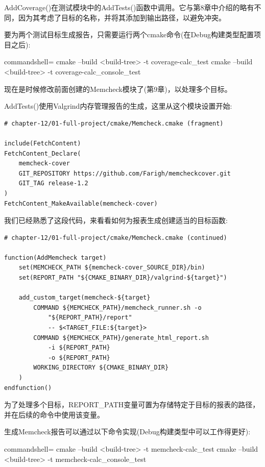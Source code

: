 AddCoverage()在测试模块中的AddTests()函数中调用。它与第8章中介绍的略有不同，因为其考虑了目标的名称，并将其添加到输出路径，以避免冲突。

要为两个测试目标生成报告，只需要运行两个cmake命令(在Debug构建类型配置项目之后):

\begin{tcblisting}{commandshell={}}
cmake --build <build-tree> -t coverage-calc_test
cmake --build <build-tree> -t coverage-calc_console_test
\end{tcblisting}

现在是时候修改前面创建的Memcheck模块了(第9章)，以处理多个目标。


AddTests()使用Valgrind内存管理报告的生成，这里从这个模块设置开始:

\begin{lstlisting}[style=styleCMake]
# chapter-12/01-full-project/cmake/Memcheck.cmake (fragment)

include(FetchContent)
FetchContent_Declare(
	memcheck-cover
	GIT_REPOSITORY https://github.com/Farigh/memcheckcover.git
	GIT_TAG release-1.2
)
FetchContent_MakeAvailable(memcheck-cover)
\end{lstlisting}

我们已经熟悉了这段代码，来看看如何为报表生成创建适当的目标函数:

\begin{lstlisting}[style=styleCMake]
# chapter-12/01-full-project/cmake/Memcheck.cmake (continued)

function(AddMemcheck target)
	set(MEMCHECK_PATH ${memcheck-cover_SOURCE_DIR}/bin)
	set(REPORT_PATH "${CMAKE_BINARY_DIR}/valgrind-${target}")
	
	add_custom_target(memcheck-${target}
		COMMAND ${MEMCHECK_PATH}/memcheck_runner.sh -o
			"${REPORT_PATH}/report"
			-- $<TARGET_FILE:${target}>
		COMMAND ${MEMCHECK_PATH}/generate_html_report.sh
			-i ${REPORT_PATH}
			-o ${REPORT_PATH}
		WORKING_DIRECTORY ${CMAKE_BINARY_DIR}
	)
endfunction()
\end{lstlisting}

为了处理多个目标，REPORT\_PATH变量可置为存储特定于目标的报表的路径，并在后续的命令中使用该变量。

生成Memcheck报告可以通过以下命令实现(Debug构建类型中可以工作得更好):

\begin{tcblisting}{commandshell={}}
cmake --build <build-tree> -t memcheck-calc_test
cmake --build <build-tree> -t memcheck-calc_console_test
\end{tcblisting}

